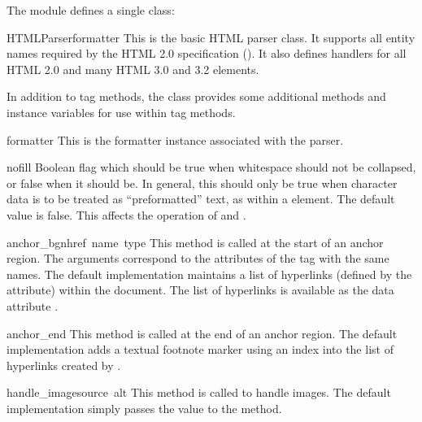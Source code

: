 The module defines a single class:

\begin{classdesc}{HTMLParser}{formatter}
This is the basic HTML parser class.  It supports all entity names
required by the HTML 2.0 specification ().  It also defines
handlers for all HTML 2.0 and many HTML 3.0 and 3.2 elements.
\end{classdesc}

In addition to tag methods, the  class provides some
additional methods and instance variables for use within tag methods.


\begin{datadesc}{formatter}
This is the formatter instance associated with the parser.
\end{datadesc}

\begin{datadesc}{nofill}
Boolean flag which should be true when whitespace should not be
collapsed, or false when it should be.  In general, this should only
be true when character data is to be treated as ``preformatted'' text,
as within a  element.  The default value is false.  This
affects the operation of  and .
\end{datadesc}


\begin{funcdesc}{anchor_bgn}{href\, name\, type}
This method is called at the start of an anchor region.  The arguments
correspond to the attributes of the  tag with the same
names.  The default implementation maintains a list of hyperlinks
(defined by the  attribute) within the document.  The list
of hyperlinks is available as the data attribute .
\end{funcdesc}

\begin{funcdesc}{anchor_end}{}
This method is called at the end of an anchor region.  The default
implementation adds a textual footnote marker using an index into the
list of hyperlinks created by .
\end{funcdesc}

\begin{funcdesc}{handle_image}{source\, alt}
This method is called to handle images.  The default implementation
simply passes the  value to the 
method.
\end{funcdesc}

